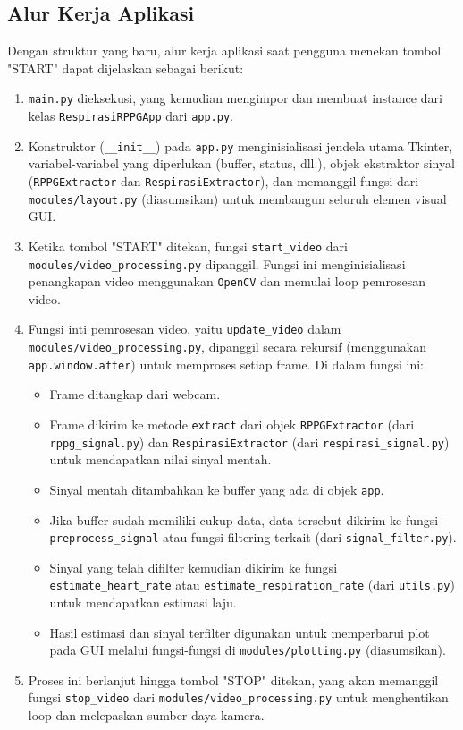 \documentclass[11pt,a4paper]{article}
\begin{document}
\subsection{Alur Kerja Aplikasi}
Dengan struktur yang baru, alur kerja aplikasi saat pengguna menekan tombol "START" dapat dijelaskan sebagai berikut:
\begin{enumerate}
    \item \texttt{main.py} dieksekusi, yang kemudian mengimpor dan membuat instance dari kelas \texttt{RespirasiRPPGApp} dari \texttt{app.py}.
    \item Konstruktor (\texttt{\_\_init\_\_}) pada \texttt{app.py} menginisialisasi jendela utama Tkinter, variabel-variabel yang diperlukan (buffer, status, dll.), objek ekstraktor sinyal (\texttt{RPPGExtractor} dan \texttt{RespirasiExtractor}), dan memanggil fungsi dari \texttt{modules/layout.py} (diasumsikan) untuk membangun seluruh elemen visual GUI.
    \item Ketika tombol "START" ditekan, fungsi \texttt{start\_video} dari \texttt{modules/video\_processing.py} dipanggil. Fungsi ini menginisialisasi penangkapan video menggunakan \texttt{OpenCV} dan memulai loop pemrosesan video.
    \item Fungsi inti pemrosesan video, yaitu \texttt{update\_video} dalam \texttt{modules/video\_processing.py}, dipanggil secara rekursif (menggunakan \texttt{app.window.after}) untuk memproses setiap frame. Di dalam fungsi ini:
    \begin{itemize}
        \item Frame ditangkap dari webcam.
        \item Frame dikirim ke metode \texttt{extract} dari objek \texttt{RPPGExtractor} (dari \texttt{rppg\_signal.py}) dan \texttt{RespirasiExtractor} (dari \texttt{respirasi\_signal.py}) untuk mendapatkan nilai sinyal mentah.
        \item Sinyal mentah ditambahkan ke buffer yang ada di objek \texttt{app}.
        \item Jika buffer sudah memiliki cukup data, data tersebut dikirim ke fungsi \texttt{preprocess\_signal} atau fungsi filtering terkait (dari \texttt{signal\_filter.py}).
        \item Sinyal yang telah difilter kemudian dikirim ke fungsi \texttt{estimate\_heart\_rate} atau \texttt{estimate\_respiration\_rate} (dari \texttt{utils.py}) untuk mendapatkan estimasi laju.
        \item Hasil estimasi dan sinyal terfilter digunakan untuk memperbarui plot pada GUI melalui fungsi-fungsi di \texttt{modules/plotting.py} (diasumsikan).
    \end{itemize}
    \item Proses ini berlanjut hingga tombol "STOP" ditekan, yang akan memanggil fungsi \texttt{stop\_video} dari \texttt{modules/video\_processing.py} untuk menghentikan loop dan melepaskan sumber daya kamera.
\end{enumerate}
\end{document}

